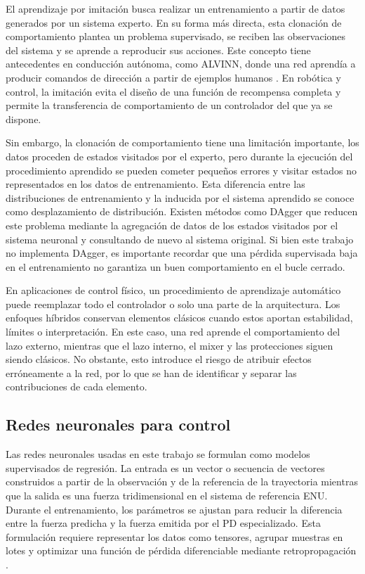 El aprendizaje por imitación busca realizar un entrenamiento a partir de datos generados 
por un sistema experto. En su forma más directa, esta clonación de comportamiento plantea 
un problema supervisado, se reciben las observaciones del sistema y se aprende a reproducir 
sus acciones. Este concepto tiene antecedentes en conducción autónoma, como ALVINN, 
donde una red aprendía a producir comandos de dirección a partir de ejemplos humanos 
\cite{pomerleau1989alvinn}. En robótica y control, la imitación evita el diseño de una 
función de recompensa completa y permite la transferencia de comportamiento de un controlador 
del que ya se dispone.

Sin embargo, la clonación de comportamiento tiene una limitación importante, los datos 
proceden de estados visitados por el experto, pero durante la ejecución del procedimiento
aprendido se pueden cometer pequeños errores y visitar estados no representados en los datos
de entrenamiento. Esta diferencia entre las distribuciones de entrenamiento y la inducida por 
el sistema aprendido se conoce como desplazamiento de distribución. Existen métodos como DAgger
\cite{ross2011dagger}
que reducen este problema mediante la agregación de datos de los estados visitados por el sistema
neuronal y consultando de nuevo al sistema original. Si bien este trabajo no implementa
DAgger, es importante recordar que una pérdida supervisada baja en el entrenamiento no garantiza
un buen comportamiento en el bucle cerrado.

En aplicaciones de control físico, un procedimiento de aprendizaje automático puede reemplazar
todo el controlador o solo una parte de la arquitectura. Los enfoques híbridos conservan elementos
clásicos cuando estos aportan estabilidad, límites o interpretación. En este caso, una red aprende
el comportamiento del lazo externo, mientras que el lazo interno, el mixer y las protecciones
siguen siendo clásicos. No obstante, esto introduce el riesgo de atribuir efectos erróneamente a la red,
por lo que se han de identificar y separar las contribuciones de cada elemento.

\subsection{Redes neuronales para control}

Las redes neuronales usadas en este trabajo se formulan como modelos
supervisados de regresión. La entrada es un vector o secuencia de vectores
construidos a partir de la observación y de la referencia de la trayectoria
mientras que la salida es una fuerza tridimensional en el sistema de referencia
ENU. Durante el entrenamiento, los parámetros se ajustan para reducir la diferencia
entre la fuerza predicha y la fuerza emitida por el PD especializado. Esta formulación 
requiere representar los datos como tensores, agrupar muestras en lotes y optimizar una
función de pérdida diferenciable mediante retropropagación
\cite{rumelhart1986learning,pytorchDocs}.

